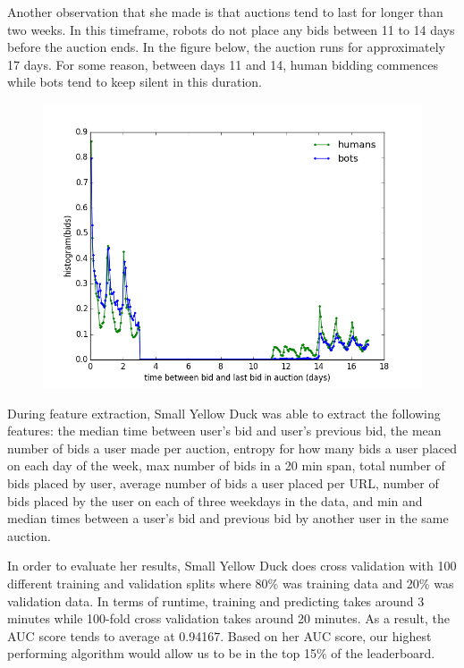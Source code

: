 \documentclass{article} %
\begin{document}
Another observation that she made is that auctions tend to last for longer than two weeks.
In this timeframe, robots do not place any bids between 11 to 14 days before the auction ends.
In the figure below, the auction runs for approximately 17 days.
For some reason, between days 11 and 14, human bidding commences while bots tend to keep silent in this duration.

\begin{figure}[h]
\centering
{\includegraphics[scale=0.26]{img/yellowduck2.png}}
\end{figure}

During feature extraction, Small Yellow Duck was able to extract the following features: the median time between user's bid and user's previous bid, the mean number of bids a user made per auction, entropy for how many bids a user placed on each day of the week, max number of bids in a 20 min span, total number of bids placed by user, average number of bids a user placed per URL, number of bids placed by the user on each of three weekdays in the data, and min and median times between a user's bid and previous bid by another user in the same auction.

In order to evaluate her results, Small Yellow Duck does cross validation with 100 different training and validation splits where 80\% was training data and 20\% was validation data.
In terms of runtime, training and predicting takes around 3 minutes while 100-fold cross validation takes around 20 minutes.
As a result, the AUC score tends to average at 0.94167. Based on her AUC score, our highest performing algorithm would allow us to be in the top 15\% of the leaderboard.
\end{document}
